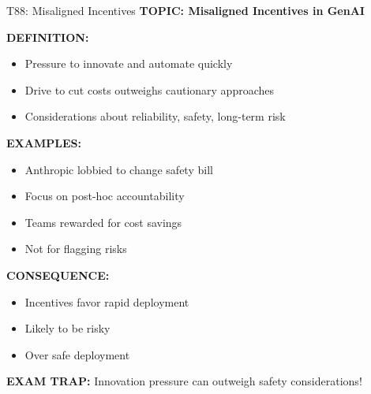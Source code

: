 \documentclass[8pt]{beamer}
\begin{document}
	\begin{frame}{T88: Misaligned Incentives}
		\fontsize{6.5}{7.5}\selectfont
		\textbf{TOPIC: Misaligned Incentives in GenAI}
		
		\vspace{0.1cm}
		\textbf{DEFINITION:}
		\begin{itemize}
			\item Pressure to innovate and automate quickly
			\item Drive to cut costs outweighs cautionary approaches
			\item Considerations about reliability, safety, long-term risk
		\end{itemize}
		
		\vspace{0.1cm}
		\textbf{EXAMPLES:}
		\begin{itemize}
			\item Anthropic lobbied to change safety bill
			\item Focus on post-hoc accountability
			\item Teams rewarded for cost savings
			\item Not for flagging risks
		\end{itemize}
		
		\vspace{0.1cm}
		\textbf{CONSEQUENCE:}
		\begin{itemize}
			\item Incentives favor rapid deployment
			\item Likely to be risky
			\item Over safe deployment
		\end{itemize}
		
		\textcolor{myred}{\textbf{EXAM TRAP:}} Innovation pressure can \textcolor{myblue}{outweigh safety considerations}!
	\end{frame}
	
\end{document}
